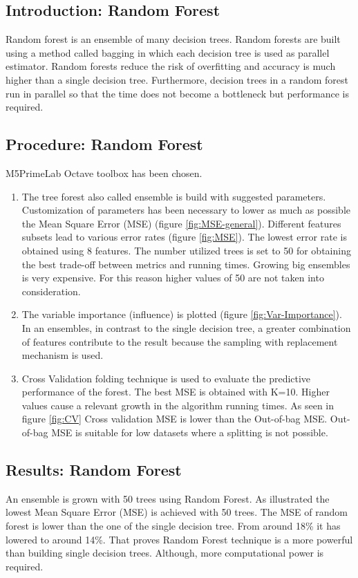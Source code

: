\documentclass{article}
\begin{document}
\vfill
\clearpage

\subsection{Introduction: Random Forest}
Random forest is an ensemble of many decision trees. Random forests are built using a method called bagging in which each decision tree is used as parallel estimator.
Random forests reduce the risk of overfitting and accuracy is much higher than a single decision tree. Furthermore, decision trees in a random forest run in parallel so that the time does not become a bottleneck but performance is required.

\subsection{Procedure: Random Forest}
M5PrimeLab Octave toolbox has been chosen.
\begin{enumerate}  
	\item The tree forest also called ensemble is build with suggested parameters. Customization of parameters has been necessary to lower as much as possible the Mean Square Error (MSE) (figure \ref{fig:MSE-general}). Different features subsets lead to various error rates (figure \ref{fig:MSE}). The lowest error rate is obtained using 8 features. The number utilized trees is set to 50 for obtaining the best trade-off between metrics and running times. Growing big ensembles is very expensive. For this reason higher values of 50 are not taken into consideration. 
	\item The variable importance (influence) is plotted (figure \ref{fig:Var-Importance}). In an ensembles, in contrast to the single decision tree, a greater combination of features contribute to the result because the sampling with replacement mechanism is used.
	\item Cross Validation folding technique is used to evaluate the predictive performance of the forest. The best MSE is obtained with K=10. Higher values cause a relevant growth in the algorithm running times. As seen in figure \ref{fig:CV} Cross validation MSE is lower than the Out-of-bag MSE. Out-of-bag MSE is suitable for low datasets where a splitting is not possible.
\end{enumerate}

\subsection{Results: Random Forest}
An ensemble is grown with 50 trees using Random Forest. As illustrated the lowest Mean Square Error (MSE) is achieved with 50 trees. The MSE of random forest is lower than the one of the single decision tree. From around 18\% it has lowered to around 14\%. That proves Random Forest technique is a more powerful than building single decision trees. Although, more computational power is required.
\end{document}
